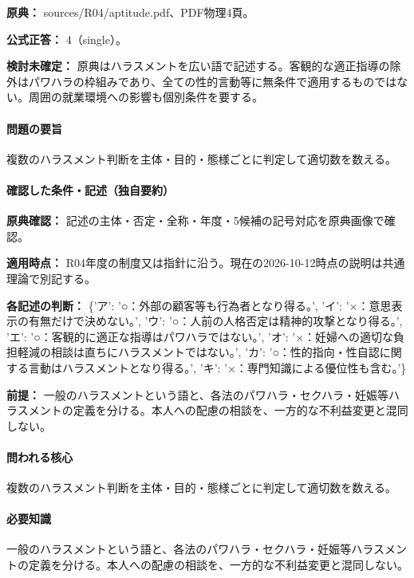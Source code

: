 \noindent\textbf{原典：} sources/R04/aptitude.pdf、PDF物理4頁。

\textbf{公式正答：} 4（single）。

\par\textbf{検討未確定：} 原典はハラスメントを広い語で記述する。客観的な適正指導の除外はパワハラの枠組みであり、全ての性的言動等に無条件で適用するものではない。周囲の就業環境への影響も個別条件を要する。

\paragraph{問題の要旨} 複数のハラスメント判断を主体・目的・態様ごとに判定して適切数を数える。

\paragraph{確認した条件・記述（独自要約）}\mbox{}\par

\noindent\textbf{原典確認：} 記述の主体・否定・全称・年度・5候補の記号対応を原典画像で確認。\par

\noindent\textbf{適用時点：} R04年度の制度又は指針に沿う。現在の2026-10-12時点の説明は共通理論で別記する。\par

\noindent\textbf{各記述の判断：} \{'ア': '○：外部の顧客等も行為者となり得る。', 'イ': '×：意思表示の有無だけで決めない。', 'ウ': '○：人前の人格否定は精神的攻撃となり得る。', 'エ': '○：客観的に適正な指導はパワハラではない。', 'オ': '×：妊婦への適切な負担軽減の相談は直ちにハラスメントではない。', 'カ': '○：性的指向・性自認に関する言動はハラスメントとなり得る。', 'キ': '×：専門知識による優位性も含む。'\}\par

\noindent\textbf{前提：} 一般のハラスメントという語と、各法のパワハラ・セクハラ・妊娠等ハラスメントの定義を分ける。本人への配慮の相談を、一方的な不利益変更と混同しない。\par

\paragraph{問われる核心} 複数のハラスメント判断を主体・目的・態様ごとに判定して適切数を数える。

\paragraph{必要知識} 一般のハラスメントという語と、各法のパワハラ・セクハラ・妊娠等ハラスメントの定義を分ける。本人への配慮の相談を、一方的な不利益変更と混同しない。

